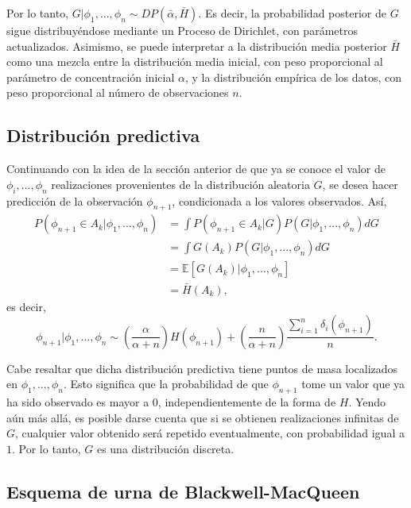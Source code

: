 Por lo tanto, $G|\phi_1,...,\phi_n \sim DP(\bar{\alpha},\bar{H})$. Es decir, la probabilidad posterior de $G$ sigue distribuy\'endose mediante un Proceso de Dirichlet, con par\'ametros actualizados. Asimismo, se puede interpretar a la distribuci\'on media posterior $\bar{H}$ como una mezcla entre la distribuci\'on media inicial, con peso proporcional al par\'ametro de concentraci\'on inicial $\alpha$, y la distribuci\'on emp\'irica de los datos, con peso proporcional al n\'umero de observaciones $n$. 

\subsection{Distribuci\'on predictiva}

Continuando con la idea de la secci\'on anterior de que ya se conoce el valor de $\phi_i,...,\phi_n$ realizaciones provenientes de la distribuci\'on aleatoria $G$, se desea hacer predicci\'on de la observaci\'on $\phi_{n+1}$, condicionada a los valores observados. As\'i,
\begin{equation*}
\begin{aligned}
   P(\phi_{n+1} \in A_k|\phi_1,...,\phi_n)
   &= \int P(\phi_{n+1} \in A_k|G) P(G|\phi_1,...,\phi_n) dG \\ 
   &= \int G(A_k) P(G|\phi_1,...,\phi_n) dG \\ 
   &= \mathbb{E}[G(A_k)|\phi_1,...,\phi_n] \\
   &= \bar{H}(A_k),
\end{aligned}    
\end{equation*}
es decir, 
\begin{equation*}
    \phi_{n+1}|\phi_1,...,\phi_n \sim 
    \left(\frac{\alpha}{\alpha + n}\right)H(\phi_{n+1}) + 
    \left(\frac{n}{\alpha + n}\right)\frac{\sum_{i=1}^n \delta_i(\phi_{n+1})}{n}.
\end{equation*}

Cabe resaltar que dicha distribuci\'on predictiva tiene puntos de masa localizados en $\phi_1,...,\phi_n$. Esto significa que la probabilidad de que $\phi_{n+1}$ tome un valor que ya ha sido observado es mayor a $0$, independientemente de la forma de $H$. Yendo a\'un m\'as all\'a, es posible darse cuenta que si se obtienen realizaciones infinitas de $G$, cualquier valor obtenido ser\'a repetido eventualmente, con probabilidad igual a $1$. Por lo tanto, $G$ es una distribuci\'on discreta.

\subsection{Esquema de urna de Blackwell-MacQueen}

